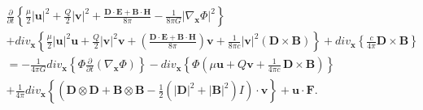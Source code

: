 \documentclass{article}
\theoremstyle{definition}
\theoremstyle{remark}
\renewcommand{\vec}[1]{\mathbf{#1}}
\begin{document}
\begin{multline}\label{vhfffngghkjgghggtghjgfhjoyuiyuyhiyyukukyihyuSYSPNNWhgjgghyuyy8yuyughghhyttyytgghhghghgghjhkjhCCmmGGKKuiiuuihjgghghiuiuiui}
\frac{\partial}{\partial t}\left\{ \frac{\mu}{2}\left|\vec
u\right|^2+\frac{Q}{2}\left|\vec v\right|^2+\frac{\vec D\cdot\vec
E+\vec B\cdot\vec H}{8\pi}-\frac{1}{8\pi G} \left|\nabla_{\vec
x}\Phi\right|^2\right\}\\+div_{\vec x}\left\{\frac{\mu}{2}\left|\vec
u\right|^2\vec u+\frac{Q}{2}\left|\vec v\right|^2\vec
v+\left(\frac{\vec D\cdot\vec E+\vec B\cdot\vec H}{8\pi}\right)\vec
v+\frac{1}{8\pi c}\left|\vec v\right|^2\left(\vec D\times \vec
B\right)\right\}+div_{\vec x}\left\{\frac{c}{4\pi}\vec D\times \vec
B\right\}\\=-\frac{1}{4\pi G}div_{\vec x}\left\{\Phi
\frac{\partial}{\partial t}\left(\nabla_{\vec
x}\Phi\right)\right\}-div_{\vec x}\left\{\Phi\left( \mu \vec u+Q\vec
v+\frac{1}{4\pi c}\,\vec D\times \vec
B\right)\right\}\\+\frac{1}{4\pi}div_{\vec x}\left\{\left(\vec
D\otimes \vec D+\vec B\otimes \vec B-\frac{1}{2}\left(|\vec
D|^2+|\vec B|^2\right)I\right)\cdot\vec v
\right\}
+\vec u\cdot\vec F.
\end{multline}
%
%
%
%
%
%
\end{document}
